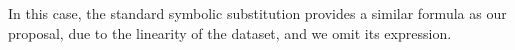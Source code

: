 In this case, the standard symbolic substitution provides a similar formula as our proposal, due to the linearity of the dataset, and we omit its expression.





